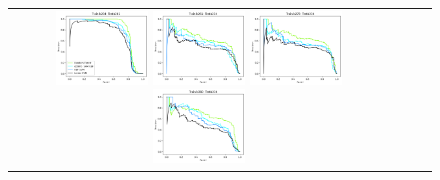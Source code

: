 \begin{figure}[h!]
\begin{tabular}{cccc}
  \includegraphics[width=0.25\textwidth]{Kap8/best-train=b234test=b261.png}  
  \includegraphics[width=0.25\textwidth]{Kap8/best-train=b261test=b234.png}
  \includegraphics[width=0.25\textwidth]{Kap8/best-train=b278test=b234.png} 
   \includegraphics[width=0.25\textwidth]{Kap8/best-train=b360test=b234.png} \\


\end{tabular}
\end{figure}
